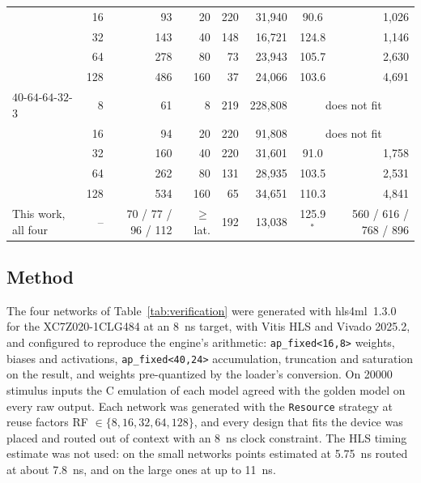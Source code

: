 \documentclass[final,5p,times,twocolumn]{elsarticle}
\begin{document}
\begin{table}[t]
\begin{tabular}{@{}lrrrrrcr@{}}
                        & 16  & 93  & 20  & 220 & 31{,}940 & 90.6  & 1{,}026 \\
                        & 32  & 143 & 40  & 148 & 16{,}721 & 124.8 & 1{,}146 \\
                        & 64  & 278 & 80  & 73  & 23{,}943 & 105.7 & 2{,}630 \\
                        & 128 & 486 & 160 & 37  & 24{,}066 & 103.6 & 4{,}691 \\
\addlinespace
$40$-$64$-$64$-$32$-$3$ & 8   & 61  & 8   & 219 & 228{,}808 & \multicolumn{2}{c}{does not fit} \\
                        & 16  & 94  & 20  & 220 & 91{,}808  & \multicolumn{2}{c}{does not fit} \\
                        & 32  & 160 & 40  & 220 & 31{,}601 & 91.0  & 1{,}758 \\
                        & 64  & 262 & 80  & 131 & 28{,}935 & 103.5 & 2{,}531 \\
                        & 128 & 534 & 160 & 65  & 34{,}651 & 110.3 & 4{,}841 \\
\midrule
This work, all four & -- & 70 / 77 / 96 / 112 & $\geq$ lat. & 192 & 13{,}038 & 125.9$^{\ast}$ & 560 / 616 / 768 / 896 \\
\bottomrule
\end{tabular}
\end{table}

\subsection{Method}
The four networks of Table~\ref{tab:verification} were generated with
hls4ml~1.3.0~\cite{Schulte2026} for the XC7Z020-1CLG484 at an
\SI{8}{\nano\second} target, with Vitis HLS and Vivado 2025.2, and configured to
reproduce the engine's arithmetic: \texttt{ap\_fixed<16,8>} weights, biases and
activations, \texttt{ap\_fixed<40,24>} accumulation, truncation and saturation
on the result, and weights pre-quantized by the loader's conversion. On
\num{20000} stimulus inputs the C emulation of each model agreed with the golden
model on every raw output. Each network was generated with the
\texttt{Resource} strategy at reuse factors RF $\in\{8,16,32,64,128\}$, and every
design that fits the device was placed and routed out of context with an
\SI{8}{\nano\second} clock constraint. The HLS timing estimate was not used: on
the small networks points estimated at \SI{5.75}{\nano\second} routed at about
\SI{7.8}{\nano\second}, and on the large ones at up to \SI{11}{\nano\second}.
\end{document}
